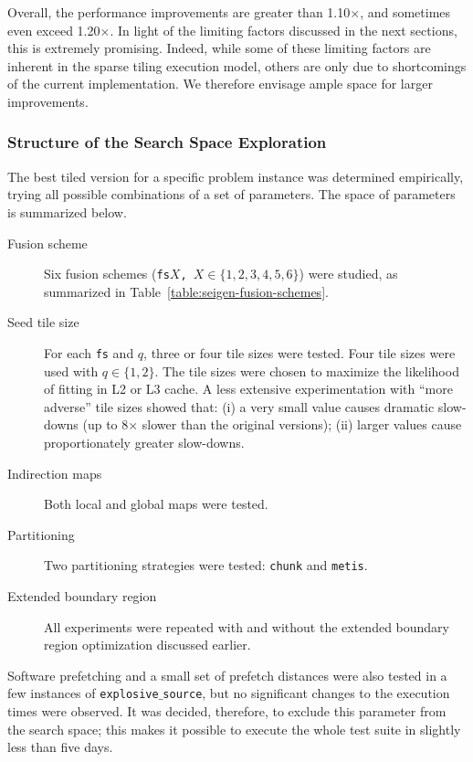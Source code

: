 Overall, the performance improvements are greater than 1.10$\times$, and sometimes even exceed 1.20$\times$. In light of the limiting factors discussed in the next sections, this is extremely promising. Indeed, while some of these limiting factors are inherent in the sparse tiling execution model, others are only due to shortcomings of the current implementation. We therefore envisage ample space for larger improvements. 



\subsubsection{Structure of the Search Space Exploration}
The best tiled version for a specific problem instance was determined empirically, trying all possible combinations of a set of parameters. The space of parameters is summarized below.

\begin{description}
\item[Fusion scheme] Six fusion schemes ({\tt fs$X$, $X \in \lbrace 1, 2, 3, 4, 5, 6\rbrace$}) were studied, as summarized in Table~\ref{table:seigen-fusion-schemes}.
\item[Seed tile size] For each {\tt fs} and $q$, three or four tile sizes were tested. Four tile sizes were used with $q \in \lbrace 1, 2\rbrace$. The tile sizes were chosen to maximize the likelihood of fitting in L2 or L3 cache. A less extensive experimentation with ``more adverse'' tile sizes showed that: (i) a very small value causes dramatic slow-downs (up to 8$\times$ slower than the original versions); (ii) larger values cause proportionately greater slow-downs.
\item[Indirection maps] Both local and global maps were tested.
\item[Partitioning] Two partitioning strategies were tested: {\tt chunk} and {\tt metis}.
\item[Extended boundary region] All experiments were repeated with and without the extended boundary region optimization discussed earlier.
\end{description}

Software prefetching and a small set of prefetch distances were also tested in a few instances of {\tt explosive$\_$source}, but no significant changes to the execution times were observed. It was decided, therefore, to exclude this parameter from the search space; this makes it possible to execute the whole test suite in slightly less than five days. 

